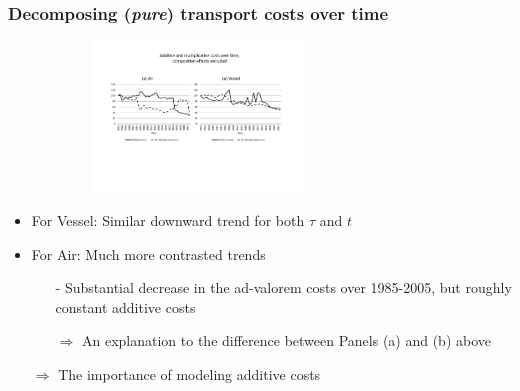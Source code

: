 \documentclass[10 pt,Helvetica, french]{beamer}
\begin{document}
\begin{frame}
\frametitle{Decomposing (\textit{pure}) transport costs over time }
\begin{figure}[htbp]
\begin{center}
\includegraphics[width=8cm, height=4cm]{Fig3b_TCovertime_add_et_mult_3d.pdf}
\end{center}
\end{figure}
\begin{itemize}
\item For Vessel: Similar downward trend for both $\tau$ and $t$
\item For Air: Much more contrasted trends
\begin{itemize}
\item[-] Substantial decrease in the ad-valorem costs over 1985-2005, but roughly constant additive costs
\item[$\Rightarrow$] An explanation to the difference between Panels (a) and (b) above
\end{itemize}
\item[$\Rightarrow$] The importance of modeling additive costs
\end{itemize}
\end{frame}
\end{document}
